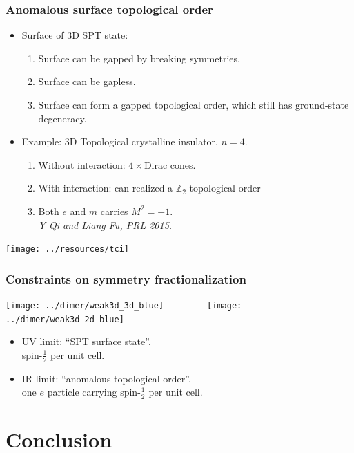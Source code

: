 \documentclass[xcolor=table, 10pt, aspectratio=169]{beamer}
\begin{document}
\begin{frame}
  \frametitle{Anomalous surface topological order}
  \begin{itemize}
    \item Surface of 3D SPT state:
    \begin{enumerate}
      \item Surface can be gapped by breaking symmetries.
      \item Surface can be gapless.
      \item Surface can form a gapped topological order, which still has ground-state degeneracy.
    \end{enumerate}
    \item Example: 3D Topological crystalline insulator, $n=4$.
    \begin{enumerate}
      \item Without interaction: $4\times$Dirac cones.
      \item With interaction: can realized a $\mathbb Z_2$ topological order
      \item Both $e$ and $m$ carries $M^2=-1$.
      \\\emph{\small Y Qi and Liang Fu, PRL 2015.}
    \end{enumerate}
  \end{itemize}
  \begin{center}
    \texttt{[image: ../resources/tci]}
  \end{center}
\end{frame}

\begin{frame}
  \frametitle{Constraints on symmetry fractionalization}
  \centering \texttt{[image: ../dimer/weak3d\_3d\_blue]}~~~~~~~~~\texttt{[image: ../dimer/weak3d\_2d\_blue]}
  \begin{itemize}
    \item UV limit: ``SPT surface state''.\\
    spin-$\frac12$ per unit cell.
    \item IR limit: ``anomalous topological order''.\\
    one $e$ particle carrying spin-$\frac12$ per unit cell.
  \end{itemize}
\end{frame}
\section{Conclusion}
\end{document}
